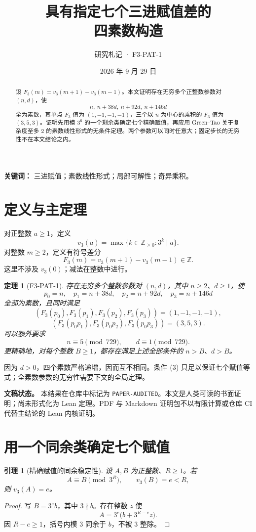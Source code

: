 \documentclass[11pt,a4paper]{ctexart}
\title{\bfseries 具有指定七个三进赋值差的\\四素数构造}
\author{研究札记 · F3-PAT-1}\date{2026 年 9 月 29 日}
\newtheorem{theorem}{定理}\newtheorem{lemma}{引理}\renewcommand{\proofname}{证明}
\newcommand{\vthree}{v_3}\newcommand{\Fthree}{F_3}
\begin{document}
\maketitle
\begin{abstract}
设 $\Fthree(m)=\vthree(m+1)-\vthree(m-1)$。本文证明存在无穷多个正整数参数对 $(n,d)$，使
\[
n,\ n+38d,\ n+92d,\ n+146d
\]
全为素数，其单点 $F_3$ 值为 $(1,-1,-1,-1)$，三个以 $n$ 为中心的乘积的 $F_3$ 值为 $(3,5,3)$。证明先用模 $3^6$ 的一个剩余类确定七个精确赋值，再应用 Green--Tao 关于复杂度至多 $2$ 的素数线性形式的无条件定理。两个参数可以同时任意大；固定步长的无穷性不在本文结论之内。
\end{abstract}
\noindent\textbf{关键词：} 三进赋值；素数线性形式；局部可解性；奇异乘积。

\section{定义与主定理}
对正整数 $a\ge1$，定义
\[
\vthree(a)=\max\{k\in\mathbb Z_{\ge0}:3^k\mid a\}.
\]
对整数 $m\ge2$，定义有符号差分
\[
\Fthree(m)=\vthree(m+1)-\vthree(m-1)\in\mathbb Z.
\]
这里不涉及 $\vthree(0)$；减法在整数中进行。

\begin{theorem}[F3-PAT-1]
存在无穷多个整数参数对 $(n,d)$，其中 $n\ge2$、$d\ge1$，使
\[
p_0=n,\quad p_1=n+38d,\quad p_2=n+92d,\quad p_3=n+146d
\]
全部为素数，且同时满足
\[
(\Fthree(p_0),\Fthree(p_1),\Fthree(p_2),\Fthree(p_3))=(1,-1,-1,-1),
\tag{1}
\]
\[
(\Fthree(p_0p_1),\Fthree(p_0p_2),\Fthree(p_0p_3))=(3,5,3).
\tag{2}
\]
可以额外要求
\[
n\equiv5\pmod{729},\qquad d\equiv1\pmod{729}.\tag{3}
\]
更精确地，对每个整数 $B\ge1$，都存在满足上述全部条件的 $n>B$、$d>B$。
\end{theorem}
因为 $d>0$，四个素数严格递增，因而互不相同。条件 (3) 只足以保证七个赋值等式；全素数参数的无穷性需要下文的全局定理。

\noindent\textbf{文稿状态。} 本结果在仓库中标记为 \texttt{PAPER-AUDITED}。本文是人类可读的书面证明；尚未形式化为 Lean 定理。PDF 与 Markdown 证明包不以有限计算或仓库 CI 代替主结论的 Lean 内核证明。

\section{用一个同余类确定七个赋值}
\begin{lemma}[精确赋值的同余稳定性]
设 $A,B$ 为正整数、$R\ge1$。若
\[
A\equiv B\pmod{3^R},\qquad \vthree(B)=e<R,
\]
则 $\vthree(A)=e$。
\end{lemma}
\begin{proof}
写 $B=3^eb$，其中 $3\nmid b$。存在整数 $z$ 使
\[
A=3^e\bigl(b+3^{R-e}z\bigr).
\]
因 $R-e\ge1$，括号内模 $3$ 同余于 $b$，不被 $3$ 整除。
\end{proof}
\end{document}
